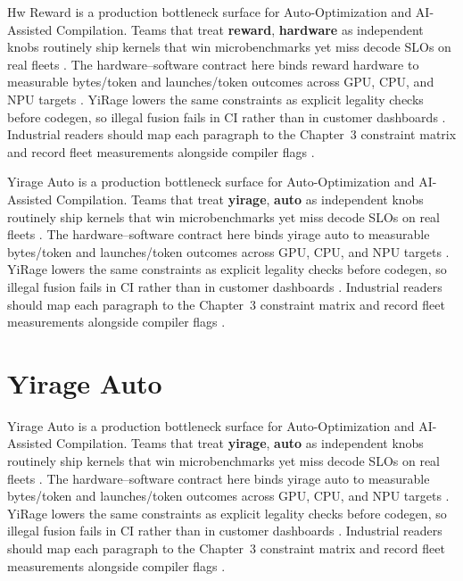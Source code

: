 Hw Reward is a production bottleneck surface for Auto-Optimization and AI-Assisted Compilation. Teams that treat \textbf{reward}, \textbf{hardware} as independent knobs routinely ship kernels that win microbenchmarks yet miss decode SLOs on real fleets \citep{patel2025llminference,nvidia2022hopper}. The hardware--software contract here binds reward hardware to measurable bytes/token and launches/token outcomes across GPU, CPU, and NPU targets \citep{taxbreak2026,semianalysis2024tma}. YiRage lowers the same constraints as explicit legality checks before codegen, so illegal fusion fails in CI rather than in customer dashboards \citep{memoryfloor2026,amd2024xdna}. Industrial readers should map each paragraph to the Chapter~3 constraint matrix and record fleet measurements alongside compiler flags \citep{nvidia2022hopper,amd2024aie}.

Yirage Auto is a production bottleneck surface for Auto-Optimization and AI-Assisted Compilation. Teams that treat \textbf{yirage}, \textbf{auto} as independent knobs routinely ship kernels that win microbenchmarks yet miss decode SLOs on real fleets \citep{taxbreak2026,semianalysis2024tma}. The hardware--software contract here binds yirage auto to measurable bytes/token and launches/token outcomes across GPU, CPU, and NPU targets \citep{memoryfloor2026,amd2024xdna}. YiRage lowers the same constraints as explicit legality checks before codegen, so illegal fusion fails in CI rather than in customer dashboards \citep{nvidia2022hopper,amd2024aie}. Industrial readers should map each paragraph to the Chapter~3 constraint matrix and record fleet measurements alongside compiler flags \citep{semianalysis2024tma,dlbook}.

\section{Yirage Auto}
\label{sec:yirage_auto}

Yirage Auto is a production bottleneck surface for Auto-Optimization and AI-Assisted Compilation. Teams that treat \textbf{yirage}, \textbf{auto} as independent knobs routinely ship kernels that win microbenchmarks yet miss decode SLOs on real fleets \citep{memoryfloor2026,amd2024xdna}. The hardware--software contract here binds yirage auto to measurable bytes/token and launches/token outcomes across GPU, CPU, and NPU targets \citep{nvidia2022hopper,amd2024aie}. YiRage lowers the same constraints as explicit legality checks before codegen, so illegal fusion fails in CI rather than in customer dashboards \citep{semianalysis2024tma,dlbook}. Industrial readers should map each paragraph to the Chapter~3 constraint matrix and record fleet measurements alongside compiler flags \citep{amd2024xdna,dao2022flashattention}.

